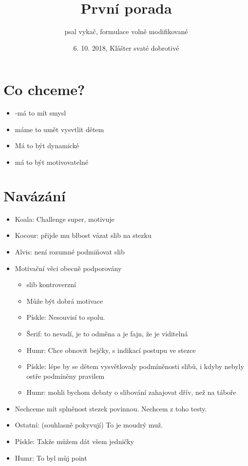 \documentclass {article}
\begin{document}
\pagestyle{empty}
\author {psal vykač, formulace volně modifikované}

\title{První porada}
\date{6. 10. 2018, Klášter svaté dobrotivé}
\maketitle


\section{Co chceme?} %
\label{sec:co_chceme_}
	\begin{itemize}
	\item -má to mít smysl
	\item máme to umět vysvtlit dětem
	\item Má to být dynamické
	\item má to být motivovatelné
	\end{itemize}

\section{Navázání} %
\label{sec:navazani}
	\begin{itemize}
		\item	Koala: Challenge super, motivuje
		\item	Kocour: přijde mu blbost vázat slib na stezku
		\item	Alvis: není rozumné podmiňovat slib
		\item	Motivační věci obecně podporovány
		\begin{itemize}
			\item	slib kontroverzní
			\item	Může být dobrá motivace
			\item	Pískle: Nesouvisí to spolu.
			\item	Šerif: to nevadí, je to odměna a je fajn, že je viditelná
			\item	Humr: Chce obnovit bejčky, s indikací postupu ve stezce
			\item	Pískle: lépe by se dětem vysvětlovaly podmíněnosti slibů, i kdyby nebyly ostře podmíněny pravilem
			\item Humr: mohli bychom debaty o slibování zahajovat dřív, než na táboře
			
		\end{itemize}
		
		\item Nechceme mít splněnost stezek povinnou. Nechcem z toho testy.
		\item Ostatní: (souhlasně pokyvují) To je moudrý muž.
		\item Pískle: Takže můžem dát všem jedničky
		\item Humr: To byl můj point



	\end{itemize}
\end{document}
